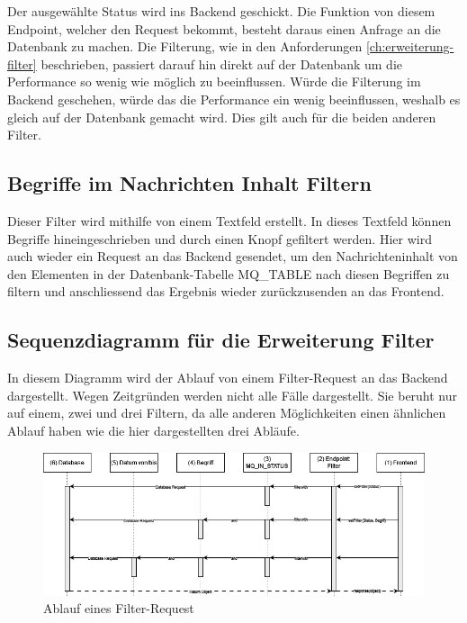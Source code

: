 \noindent Der ausgewählte Status wird ins Backend geschickt. Die Funktion von diesem Endpoint, welcher den Request bekommt, besteht daraus einen Anfrage an die Datenbank zu machen. Die Filterung, wie in den Anforderungen \ref{ch:erweiterung-filter} beschrieben, passiert darauf hin direkt auf der Datenbank um die Performance so wenig wie möglich zu beeinflussen. Würde die Filterung im Backend geschehen, würde das die Performance ein wenig beeinflussen, weshalb es gleich auf der Datenbank gemacht wird. Dies gilt auch für die beiden anderen Filter.

\subsection{Begriffe im Nachrichten Inhalt Filtern}
Dieser Filter wird mithilfe von einem Textfeld erstellt. In dieses Textfeld können Begriffe hineingeschrieben und durch einen Knopf gefiltert werden. Hier wird auch wieder ein Request an das Backend gesendet, um den Nachrichteninhalt von den Elementen in der Datenbank-Tabelle MQ\_TABLE nach diesen Begriffen zu filtern und anschliessend das Ergebnis wieder zurückzusenden an das Frontend.

\subsection{Sequenzdiagramm für die Erweiterung Filter}
In diesem Diagramm wird der Ablauf von einem Filter-Request an das Backend dargestellt. Wegen Zeitgründen werden nicht alle Fälle dargestellt. Sie beruht nur auf einem, zwei und drei Filtern, da alle anderen Möglichkeiten einen ähnlichen Ablauf haben wie die hier dargestellten drei Abläufe.

\begin{figure}[H]
	\begin{center}
		\includegraphics[width=1\textwidth]{ressourcen/Sequenzdiagramm-Erweiterung}
		\caption[Ablauf eines Filter-Request]{Ablauf eines Filter-Request}\label{fig:sequenzdiagramm-erweiterung-filter}
	\end{center}
\end{figure}

